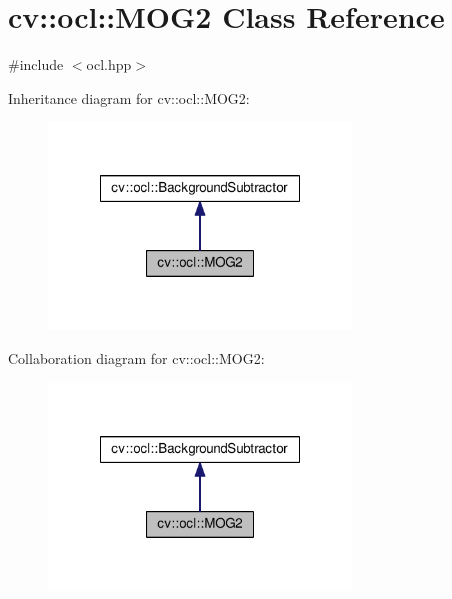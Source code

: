 \hypertarget{classcv_1_1ocl_1_1MOG2}{\section{cv\-:\-:ocl\-:\-:M\-O\-G2 Class Reference}
\label{classcv_1_1ocl_1_1MOG2}
}


{\ttfamily \#include $<$ocl.\-hpp$>$}



Inheritance diagram for cv\-:\-:ocl\-:\-:M\-O\-G2\-:\nopagebreak
\begin{figure}[H]
\begin{center}
\leavevmode
\includegraphics[width=228pt]{classcv_1_1ocl_1_1MOG2__inherit__graph}
\end{center}
\end{figure}


Collaboration diagram for cv\-:\-:ocl\-:\-:M\-O\-G2\-:\nopagebreak
\begin{figure}[H]
\begin{center}
\leavevmode
\includegraphics[width=228pt]{classcv_1_1ocl_1_1MOG2__coll__graph}
\end{center}
\end{figure}
